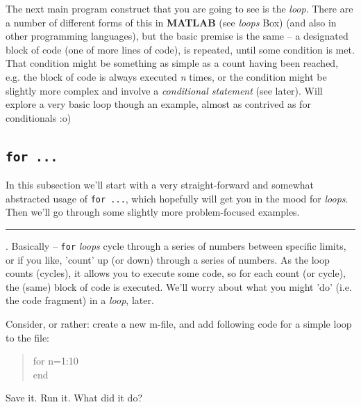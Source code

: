 \documentclass{tufte-book} %
\newenvironment{docspec}{\begin{quotation}\ttfamily\parskip0pt\parindent0pt\ignorespaces}{\end{quotation}}
\begin{document}
The next main program construct that you are going to see is the \textit{loop}.
 There are a number of different forms of this in \textbf{MATLAB} (see \textit{loops} Box)  (and also in other programming languages), but the basic premise is the same -- a designated block of code (one of more lines of code), is repeated, until some condition is met. That condition might be something as simple as a count having been reached, e.g. the block of code is always executed  \textit{n} times, or the condition might be slightly more complex and involve a \textit{conditional statement} (see later). Will explore a very basic loop though an example, almost as contrived as for conditionals :o)


\subsection{\texttt{for ...}}

In this subsection we'll start with a very straight-forward and somewhat abstracted usage of \texttt{for ...}, which hopefully will get you in the mood for \textit{loops}. Then we'll go through some slightly more problem-focused examples.

\vspace{1mm}
\noindent\rule{4cm}{0.5pt}
\vspace{-2mm}

. Basically -- \texttt{for} \textit{loops} cycle through a series of numbers between specific limits, or if you like, 'count' up (or down) through a series of numbers. As the loop counts (cycles), it allows you to execute some code, so for each count (or cycle), the (same) block of code is executed. We'll worry about what you might 'do' (i.e. the code fragment) in a \textit{loop}, later.

Consider, or rather: create a new \textsf{m-file}, and add following  code for a simple loop to the file:
\begin{docspec}
for n=1:10
\\end
\end{docspec}
Save it. Run it. What did it do?
\end{document}

